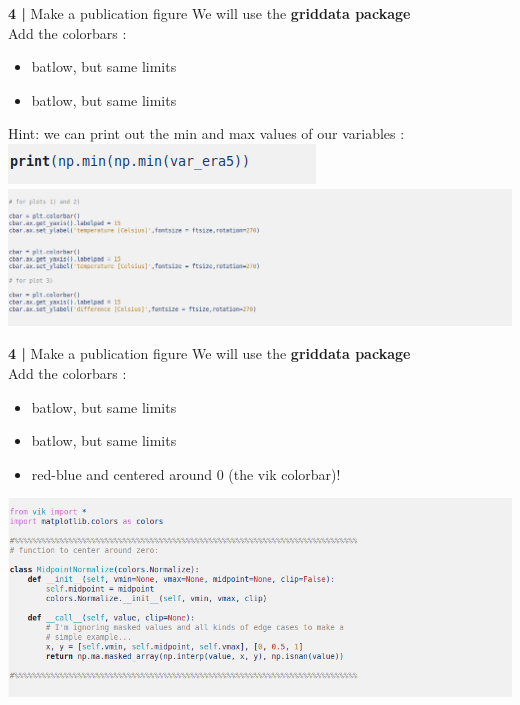 \begin{frame}{\textbf{4 |} Make a publication figure} 
    We will use the \textbf{griddata package}\\
        \vspace{0.3cm} 
    Add the colorbars : \\
    \begin{itemize}
        \item batlow, but same limits
        \item batlow, but same limits
    \end{itemize}
    Hint: we can print out the min and max values of our variables :
    \includegraphics[scale=0.35]{images/hint.png}\\
    \includegraphics[scale=0.35]{images/Script5_step7.png}
\end{frame}


\begin{frame}{\textbf{4 |} Make a publication figure} 
    We will use the \textbf{griddata package}\\
        \vspace{0.3cm} 
    Add the colorbars : \\
    \begin{itemize}
        \item batlow, but same limits
        \item batlow, but same limits
        \item red-blue and centered around 0 (the vik colorbar)! 
    \end{itemize}
    \includegraphics[scale=0.35]{images/Script5_step6.png}
\end{frame}



